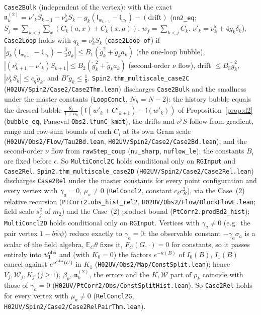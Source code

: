 \documentclass[11pt]{amsart}
\theoremstyle{definition}
\theoremstyle{remark}
\numberwithin{equation}{section}
\begin{document}
\texttt{Case2Bulk} (independent of the vertex): with the exact $\mathfrak n^{(2)}_k=\nu'_kS_{k+1}-\nu^\flat_kS_k
-g_k(\mathfrak l_{w_{k+1}}-\mathfrak l_{w_k})-(\text{drift})$ (\texttt{nn2\_eq}; $S_j=\sum_{k<j}\sum_x(C_k(a,x)+C_k(x,a))$,
$w_j=\sum_{k<j}C_k$, $\nu'_k=\nu^\flat_k+4g_k\delta_k$), \texttt{Case2Loop} holds with $q_k=\nu^\flat_kS_k$
(\texttt{case2Loop\_of}) if $|g_k(\mathfrak l_{w_{k+1}}-\mathfrak l_{w_k})-\frac\beta3\check g_k|\le B_1(\check g_k^2+\check g_ka_k)$
(the one-loop bubble), $|(\nu^\flat_{k+1}-\nu'_k)S_{k+1}|\le B_2(\check g_k^2+\check g_ka_k)$ (second-order $\nu$ flow),
drift $\le B_3\check g_k^2$, $|\nu^\flat_kS_k|\le c_q\check g_k$, and $B'\check g_k\le\frac18$.
\texttt{Spin2.thm\_multiscale\_case2C} (\texttt{H02UV/Spin2/Case2/Case2Thm.lean}) discharges \texttt{Case2Bulk} and the
smallness under the master constants (\texttt{LoopConcl}, $N_h=N-2$): the history bubble equals the dressed bubble
$\frac{\check g_k}{1+n_k}(\mathfrak l(w'_k+C'_{k+1})-\mathfrak l(w'_k))$ of Proposition~\ref{prop:d2}
(\texttt{bubble\_eq}, Parseval \texttt{Obs2.lfunC\_kmat}), the drifts and $\nu^\flat S$ follow from gradient,
range and row-sum bounds of each $C_i$ at its own Gram scale (\texttt{H02UV/Obs2/Flow/Tau2Bd.lean}, \texttt{H02UV/Spin2/Case2/Case2Bd.lean}),
and the second-order $\nu$ flow from \texttt{rawStep\_coup} (\texttt{nu\_sharp}, \texttt{nuflow\_le}); the constants
$B_i$ are fixed before $\epsilon$. So \texttt{MultiConcl2C} holds conditional only on \texttt{RGInput} and \texttt{Case2Rel}.
\texttt{Spin2.thm\_multiscale\_case2D} (\texttt{H02UV/Spin2/Case2/Case2Rel.lean}) discharges \texttt{Case2Rel} under the
master constants for every point configuration and every vertex with $\gamma_a=0$, $\mu_a\ne0$
(\texttt{RelConcl2}, constant $c_\delta c_R^2$), via the Case~(2) relative recursion
(\texttt{PtCorr2.obs\_hist\_rel2}, \texttt{H02UV/Obs2/Flow/BlockFlowE.lean}; field scale $s_j^2$ of $m_2$) and the Case~(2)
product bound (\texttt{PtCorr2.prodBd2\_hist}); \texttt{MultiConcl2D} holds conditional only on \texttt{RGInput}.
Vertices with $\gamma_a\ne0$ (e.g.\ the pair vertex $1-b\bar\psi\psi$) reduce exactly to $\gamma_a=0$: the observable
constant $-\gamma_a\sigma_a$ is a scalar of the field algebra, $\mathbb E_C\theta$ fixes it, $F_C(G,\cdot)=0$ for constants, so it
passes entirely into $u^{\rm obs}_1$ and (with $K_0=0$) the factors $e^{-\kappa(B)}$ of $I_0(B)$, $I_1(B)$ cancel against
$e^{u^{\rm obs}(U)}$ in $K_1$ (\texttt{H02UV/Obs2/Map/ConstSplit.lean}); hence $V_j,\mathcal W_j,K_j$ ($j\ge1$), $\beta_k$, $\mathfrak n^{(2)}_k$, the errors
and the $K,\mathcal W$ part of $\rho_k$ coincide with those of $\gamma_a=0$ (\texttt{H02UV/PtCorr2/Obs/ConstSplitHist.lean}). So \texttt{Case2Rel}
holds for every vertex with $\mu_a\ne0$ (\texttt{RelConcl2G}, \texttt{H02UV/Spin2/Case2/Case2RelPairThm.lean}).
\end{document}
